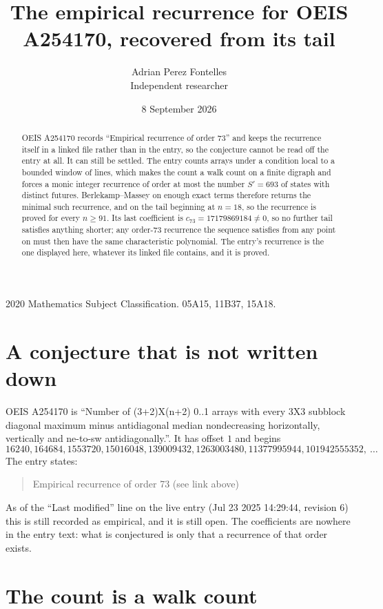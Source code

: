 \documentclass[11pt,a4paper]{article}
\title{The empirical recurrence for OEIS A254170, recovered from its tail}
\author{Adrian Perez Fontelles\\ \small Independent researcher}
\date{8 September 2026}
\theoremstyle{plain}
\theoremstyle{definition}
\begin{document}
\maketitle

\begin{abstract}
OEIS A254170 records ``Empirical recurrence of order $73$'' and keeps the recurrence itself in
a linked file rather than in the entry, so the conjecture cannot be read off the entry at all.
It can still be settled. The entry counts arrays under a condition local to a bounded window of
lines, which makes the count a walk count on a finite digraph and forces a monic integer
recurrence of order at most the number $S'=693$ of states with distinct futures. Berlekamp--Massey on
enough exact terms therefore returns the minimal such recurrence, and on the tail beginning at $n=18$, so the recurrence is proved for every $n\ge91$.
Its last coefficient is $c_{73}=17179869184\neq0$, so no further tail satisfies anything
shorter; any order-$73$ recurrence the sequence satisfies from any point on must then have
the same characteristic polynomial. The entry's recurrence is the one displayed here, whatever
its linked file contains, and it is proved.
\end{abstract}

\noindent\small 2020 Mathematics Subject Classification. 05A15, 11B37, 15A18.\normalsize

\section{A conjecture that is not written down}

OEIS A254170 is ``Number of (3+2)X(n+2) 0..1 arrays with every 3X3 subblock diagonal maximum minus antidiagonal median nondecreasing horizontally, vertically and ne-to-sw antidiagonally.''. It has offset $1$ and begins
\[
16240, 164684, 1553720, 15016048, 139009432, 1263003480, 11377995944, 101942555352,\ \dots
\]
The entry states:
\begin{quote}
Empirical recurrence of order 73 (see link above)
\end{quote}
As of the ``Last modified'' line on the live entry (Jul 23 2025 14:29:44, revision 6)
this is still recorded as empirical, and it is still open. The coefficients are nowhere in the
entry text: what is conjectured is only that a recurrence of that order exists.

\section{The count is a walk count}
\end{document}
